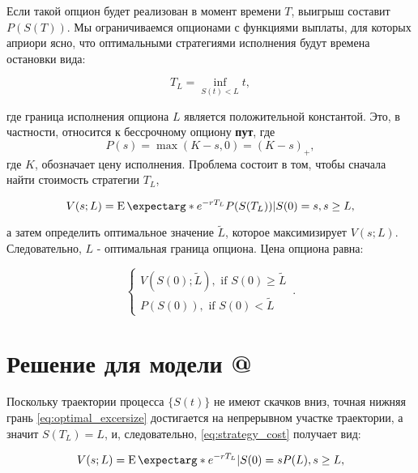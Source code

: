 \documentclass[a4paper,12pt]{article}
\makeatletter
\theoremstyle{definition}
\newcommand*{\rom}[1]{\expandafter\@slowromancap\romannumeral #1@}
\newcommand{\expect}{\operatorname{E}\expectarg}
\makeatother
\begin{document}
Если такой опцион будет реализован в момент времени $T$, выигрыш составит $P(S(T))$. Мы ограничиваемся опционами с функциями выплаты, для которых априори ясно, что оптимальными стратегиями исполнения будут времена остановки вида:

\begin{equation}\label{eq:optimal_excersize}
T_L = \inf\limits_{S(t) < L}{t},
\end{equation}

где граница исполнения опциона $L$ является положительной константой. Это, в частности, относится к бессрочному опциону \textbf{пут}, где 
\begin{equation}\label{eq:payoff_function}
P(s) = \max(K - s, 0) = (K - s)_+,
\end{equation}
где $K$, обозначает цену исполнения. Проблема состоит в
том, чтобы сначала найти стоимость стратегии $T_L$,

\begin{equation}\label{eq:strategy_cost}
V(s; L) = \expect*{e^{-rT_L} P(S(T_L)) | S(0) = s}, s \ge L,
\end{equation}

а затем определить оптимальное значение $\widetilde{L}$, которое
максимизирует $V(s; L)$. Следовательно, $L$ - оптимальная граница опциона. Цена опциона равна:

\begin{equation}\label{eq:option_price}
    \begin{cases}
      V(S(0); \widetilde{L}), \text{ if } S(0) \ge \widetilde{L}\\
      P(S(0)), \text{ if } S(0) < \widetilde{L}
    \end{cases}\,.
\end{equation}

\section{Решение для модели \rom{1}}

Поскольку траектории процесса $\{S(t)\}$ не имеют скачков вниз, точная нижняя грань \eqref{eq:optimal_excersize} достигается на непрерывном участке траектории, а значит $S(T_L) = L$, и, следовательно, \eqref{eq:strategy_cost} получает вид:

\begin{equation}\label{eq:strategy_c1}
V(s; L) = \expect*{e^{-rT_L} | S(0) = s} P(L), s \ge L,
\end{equation}
\end{document}
